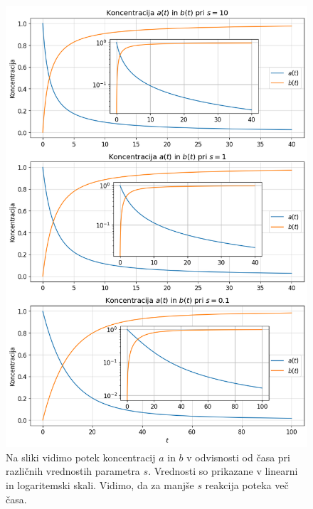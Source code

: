 \documentclass[slovene,11pt,a4paper]{article}
\begin{document}
\begin{figure}[h!]
\centering
\includegraphics[width=15cm]{binarna2.png}
\caption{Na sliki vidimo potek koncentracij $a$ in $b$ v odvisnosti od časa pri različnih vrednostih parametra $s$. Vrednosti so prikazane v linearni in logaritemski skali. Vidimo, da za manjše $s$ reakcija poteka več časa.}
\end{figure}

\newpage
\end{document}
